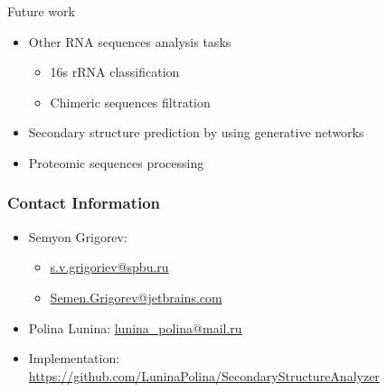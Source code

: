 \documentclass[xcolor=table]{beamer}
\begin{document}
\begin{frame}{Future work}
\begin{itemize}
    \item Other RNA sequences analysis tasks
    \begin{itemize}
        \item 16s rRNA classification
        \item Chimeric sequences filtration
    \end{itemize}
    \item Secondary structure prediction by using generative networks
    \item Proteomic sequences processing
\end{itemize}

\end{frame}

\begin{frame}
\frametitle{Contact Information}
\begin{itemize}
  \item Semyon Grigorev:
    \begin{itemize}
      \item \href{mailto:s.v.grigoriev@spbu.ru}{s.v.grigoriev@spbu.ru}
      \item \href{mailto:Semen.Grigorev@jetbrains.com}{Semen.Grigorev@jetbrains.com}
    \end{itemize}
  \item Polina Lunina: \href{mailto:lunina\_polina@mail.ru}{lunina\_polina@mail.ru}
  \item Implementation: \href{https://github.com/LuninaPolina/SecondaryStructureAnalyzer}{https://github.com/LuninaPolina/SecondaryStructureAnalyzer}
\end{itemize}
\vspace{0.3cm}
\end{frame}
\end{document}
